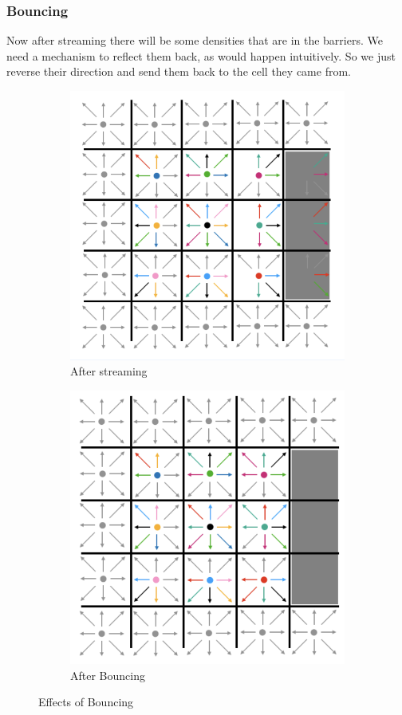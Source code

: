 \documentclass[12pt]{article}
\begin{document}
\subsubsection{Bouncing}
Now after streaming there will be some densities that are in the barriers. We need a mechanism to reflect them back, as would happen intuitively. So we just reverse their direction and send them back to the cell they came from.
\begin{figure}[hbt!]
\centering
\begin{subfigure}{0.4\textwidth}
  \centering
  \includegraphics[width=0.9\linewidth]{plot11.png}
  \caption{After streaming}
  \label{fig:sub1}
\end{subfigure}%
\begin{subfigure}{0.4\textwidth}
  \centering
  \includegraphics[width=0.9\linewidth]{plot12.png}
  \caption{After Bouncing}
  \label{fig:sub2}
\end{subfigure}
\caption{Effects of Bouncing}
\label{fig:test}
\end{figure}
\FloatBarrier 
\end{document}
